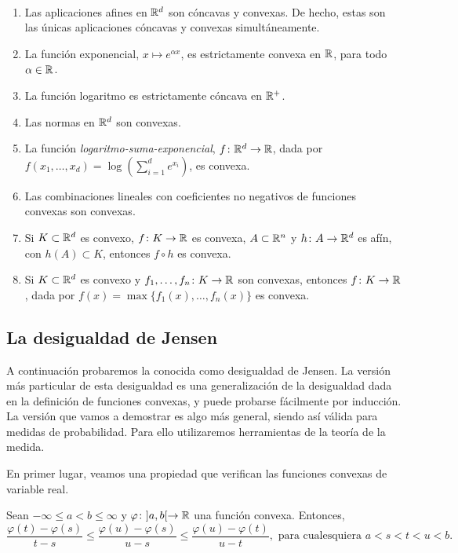 \documentclass{book}
\begin{document}
\begin{example}~
	\begin{enumerate}
		\item Las aplicaciones afines en $\mathbb{R}^d$ son cóncavas y convexas. De hecho, estas son las únicas aplicaciones cóncavas y convexas simultáneamente.
		\item La función exponencial, $x \mapsto e^{\alpha x}$, es estrictamente convexa en $\mathbb{R}$, para todo $\alpha \in \mathbb{R}$.
		\item La función logaritmo es estrictamente cóncava en $\mathbb{R}^+$.
		\item Las normas en $\mathbb{R}^d$ son convexas.
		\item La función \emph{logaritmo-suma-exponencial}, $f\colon \mathbb{R}^d \to \mathbb{R}$, dada por $f(x_1,\dots,x_d) = \log(\sum_{i=1}^d e^{x_i})$, es convexa.
		\item Las combinaciones lineales con coeficientes no negativos de funciones convexas son convexas.
		\item Si $K \subset \mathbb{R}^d$ es convexo, $f \colon K \to \mathbb{R}$ es convexa, $A \subset \mathbb{R}^n$ y $h\colon A \to \mathbb{R}^d$ es afín, con $h(A) \subset K$, entonces $f \circ h$ es convexa.
		\item Si $K \subset \mathbb{R}^d$ es convexo y $f_1,\dots,f_n \colon K \to \mathbb{R}$ son convexas, entonces $f \colon K \to \mathbb{R}$, dada por $f(x) = \max\{f_1(x),\dots,f_n(x)\}$ es convexa.
	\end{enumerate}
\end{example}

\subsection{La desigualdad de Jensen}

A continuación probaremos la conocida como desigualdad de Jensen. La versión más particular de esta desigualdad es una generalización de la desigualdad dada en la definición de funciones convexas, y puede probarse fácilmente por inducción. La versión que vamos a demostrar es algo más general, siendo así válida para medidas de probabilidad. Para ello utilizaremos herramientas de la teoría de la medida.

En primer lugar, veamos una propiedad que verifican las funciones convexas de variable real.

\begin{lem} \label{lem:secantes}
	Sean $-\infty \le a < b \le \infty$ y $\varphi \colon ]a,b[ \to \mathbb{R}$ una función convexa. Entonces,
	\[ \frac{\varphi(t) - \varphi(s)}{t-s} \le \frac{\varphi(u)-\varphi(s)}{u - s} \le \frac{\varphi(u)-\varphi(t)}{u-t}, \text{ para cualesquiera } a < s < t < u < b.\]
\end{lem}
\end{document}
